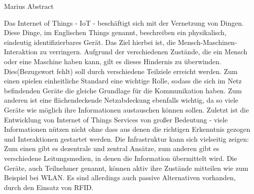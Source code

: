 Marius Abstract

Das Internet of Things - IoT - beschäftigt sich mit der Vernetzung von Dingen. Diese Dinge, im Englischen Things genannt, beschreiben ein physikalisch, eindeutig identifizierbares Gerät. Das Ziel hierbei ist, die Mensch-Maschinen-Interaktion zu verringern.  Aufgrund der verschiedenen Zustände, die ein Mensch oder eine Maschine haben kann, gilt es dieses Hindernis zu überwinden. Dies(Bezugswort fehlt) soll durch verschiedene Teilziele erreicht werden. Zum einen spielen einheitliche Standard eine wichtige Rolle, sodass die sich im Netz befindenden Geräte die gleiche Grundlage für die Kommunikation haben. Zum anderen ist eine flächendeckende Netzabdeckung ebenfalls wichtig, da so viele Geräte wie möglich ihre Informationen austauschen können sollen. Zuletzt ist die Entwicklung von Internet of Things Services von großer Bedeutung - viele Informationen nützen nicht ohne dass aus denen die richtigen Erkenntnis gezogen und Interaktionen gestartet werden. Die Infrastruktur kann sich vielseitig zeigen: Zum einen gibt es dezentrale und zentral Ansätze, zum anderen gibt es verschiedene Leitungsmedien, in denen die Information übermittelt wird. Die Geräte, auch Teilnehmer genannt, können aktiv ihre Zustände mitteilen wie zum Beispiel bei WLAN. Es sind allerdings auch passive Alternativen vorhanden, durch den Einsatz von RFID.
